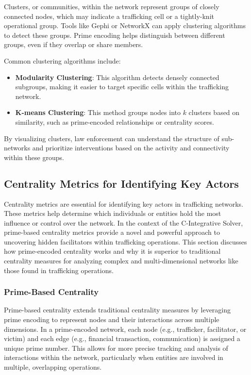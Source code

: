 \documentclass[%
 preprint, linenumbers,
 amsmath,amssymb,
 aps, physrev,
]{revtex4-2}
\begin{document}
Clusters, or communities, within the network represent groups of closely connected nodes, which may indicate a trafficking cell or a tightly-knit operational group. Tools like Gephi or NetworkX can apply clustering algorithms to detect these groups. Prime encoding helps distinguish between different groups, even if they overlap or share members.

Common clustering algorithms include:

\begin{itemize}
    \item \textbf{Modularity Clustering}: This algorithm detects densely connected subgroups, making it easier to target specific cells within the trafficking network.
    \item \textbf{K-means Clustering}: This method groups nodes into \(k\) clusters based on similarity, such as prime-encoded relationships or centrality scores.
\end{itemize}

By visualizing clusters, law enforcement can understand the structure of sub-networks and prioritize interventions based on the activity and connectivity within these groups.


\subsection{Centrality Metrics for Identifying Key Actors}

Centrality metrics are essential for identifying key actors in trafficking networks. These metrics help determine which individuals or entities hold the most influence or control over the network. In the context of the C-Integrative Solver, prime-based centrality metrics provide a novel and powerful approach to uncovering hidden facilitators within trafficking operations. This section discusses how prime-encoded centrality works and why it is superior to traditional centrality measures for analyzing complex and multi-dimensional networks like those found in trafficking operations.

\subsubsection{Prime-Based Centrality}

Prime-based centrality extends traditional centrality measures by leveraging prime encoding to represent nodes and their interactions across multiple dimensions. In a prime-encoded network, each node (e.g., trafficker, facilitator, or victim) and each edge (e.g., financial transaction, communication) is assigned a unique prime number. This allows for more precise tracking and analysis of interactions within the network, particularly when entities are involved in multiple, overlapping operations.
\end{document}
